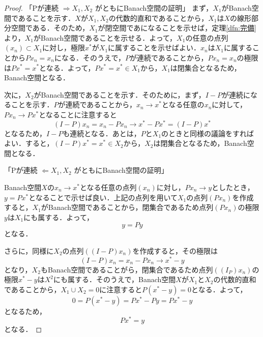 \begin{proof}
  「Pが連続 $\Rightarrow X_1, X_2$ がともにBanach空間の証明」
  まず，$X_1$がBanach空間であることを示す．$X$が$X_1, X_2$の代数的直和であることから，$X_1$は$X$の線形部分空間である．そのため，$X_1$が閉空間であになることを示せば，定理\ref{dfn:完備}より，$X_1$がBanach空間であることを示せる．よって，$X_1$の任意の点列$(x_n) \subset X_1$に対し，極限$x^*$が$X_1$に属することを示せばよい．$x_n$は$X_1$に属することから$Px_n = x_n$になる．そのうえで，$P$が連続であることから，$Px_n = x_n$の極限は$Px^* = x^*$となる．よって，$Px^*=x^* \in X_1$から，$X_1$は閉集合となるため，Banach空間となる．

  次に，$X_2$がBanach空間であることを示す．そのために，まず，$I-P$が連続になることを示す．$P$が連続であることから，$x_n \rightarrow x^*$となる任意の$x_n$に対して，$Px_n \rightarrow Px^*$となることに注意すると
  \begin{equation*}
    (I-P)x_n = x_n - Px_n \rightarrow x^* - P x^* = (I-P)x^*
  \end{equation*}
  となるため，$I-P$も連続となる．あとは，$P$と$X_1$のときと同様の議論をすればよい．すると，$(I-P)x^*=x^* \in X_2$から，$X_2$は閉集合となるため，Banach空間となる．


  「Pが連続 $\Leftarrow X_1, X_2$ がともにBanach空間の証明」

  Banach空間$X$の$x_n \rightarrow x^*$となる任意の点列$(x_n)$に対し，$Px_n \rightarrow y$としたとき，$y=Px^*$となることで示せば良い．上記の点列を用いて$X_1$の点列$(Px_n)$を作成すると，$X_1$がBanach空間であることから，閉集合であるため点列$(Px_n)$の極限$y$は$X_1$にも属する．よって，
  \begin{equation*}
    y=Py
  \end{equation*}
  となる．

  さらに，同様に$X_2$の点列$((I-P)x_n)$を作成すると，その極限は
  \begin{equation*}
    (I-P)x_n=x_n-Px_n \rightarrow x^*-y
  \end{equation*}
  となり，$X_2$もBanach空間であることがら，閉集合であるため点列$((I_P)x_n)$の極限$x^*-y$は$X^2$にも属する．そのうえで，Banach空間$X$が$X_1$と$X_2$の代数的直和であることから，$X_1 \cup X_2={0}$に注意すると$P(x^*-y)=0$となる．よって，
  \begin{equation*}
    0=P(x^*-y)=Px^*-Py=Px^*-y
  \end{equation*}
  となるため，
  \begin{equation*}
    Px^*=y
  \end{equation*}
  となる．
\end{proof}


